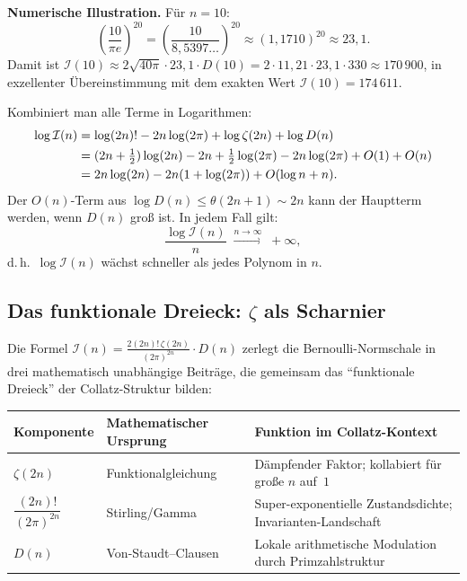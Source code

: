 \documentclass[12pt,a4paper]{article}
\newcommand{\In}{\mathcal{I}}      %
\newcommand{\Denom}[1]{D(#1)}     %
\begin{document}
\medskip
\textbf{Numerische Illustration.} Für $n = 10$:
\[
  \left(\frac{10}{\pi e}\right)^{20}
  = \left(\frac{10}{8{,}5397\ldots}\right)^{20}
  \approx (1{,}1710)^{20}
  \approx 23{,}1.
\]
Damit ist $\In(10) \approx 2\sqrt{40\pi}\cdot 23{,}1\cdot\Denom{10}
= 2\cdot 11{,}21\cdot 23{,}1\cdot 330 \approx 170\,900$,
in exzellenter Übereinstimmung mit dem exakten Wert $\In(10) = 174\,611$.

Kombiniert man alle Terme in Logarithmen:
\begin{align}
  \log\In(n) &= \log(2n)! - 2n\log(2\pi) + \log\zeta(2n) + \log\Denom{n}
               \notag \\
             &= (2n+\tfrac{1}{2})\log(2n) - 2n + \tfrac{1}{2}\log(2\pi)
                - 2n\log(2\pi) + O(1) + O(n) \notag \\
             &= 2n\log(2n) - 2n(1+\log(2\pi)) + O(\log n + n). \label{eq:log-asym}
\end{align}
Der $O(n)$-Term aus $\log\Denom{n} \leq \theta(2n+1) \sim 2n$ kann der Hauptterm
werden, wenn $\Denom{n}$ groß ist. In jedem Fall gilt:
\[
  \frac{\log\In(n)}{n} \;\xrightarrow{n\to\infty}\; +\infty,
\]
d.\,h.\ $\log\In(n)$ wächst schneller als jedes Polynom in $n$.

\subsection{Das funktionale Dreieck: \texorpdfstring{$\zeta$}{zeta} als Scharnier}
\label{subsec:dreieck}

Die Formel $\In(n) = \frac{2(2n)!\,\zeta(2n)}{(2\pi)^{2n}}\cdot\Denom{n}$ zerlegt
die Bernoulli-Normschale in drei mathematisch unabhängige Beiträge, die gemeinsam
das ``funktionale Dreieck'' der Collatz-Struktur bilden:

\begin{center}
\renewcommand{\arraystretch}{1.5}
\begin{tabular}{p{3.5cm} p{4.2cm} p{5.5cm}}
\toprule
\textbf{Komponente} & \textbf{Mathematischer Ursprung} & \textbf{Funktion im Collatz-Kontext} \\
\midrule
$\zeta(2n)$ & Funktionalgleichung & Dämpfender Faktor; kollabiert für große $n$ auf~$1$ \\
$\dfrac{(2n)!}{(2\pi)^{2n}}$ & Stirling/Gamma & Super-exponentielle Zustandsdichte; Invarianten-Landschaft \\
$\Denom{n}$ & Von-Staudt--Clausen & Lokale arithmetische Modulation durch Primzahlstruktur \\
\bottomrule
\end{tabular}
\end{center}
\end{document}
